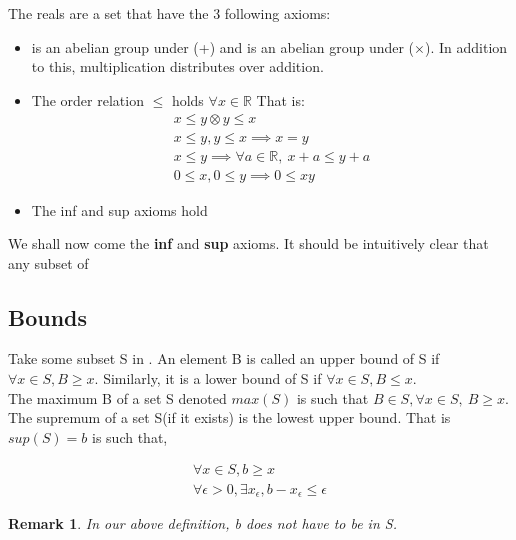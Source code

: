 \documentclass[titlepage]{article}
\newtheorem{remark}{Remark}[section]
\numberwithin{equation}{subsection}
\begin{document}
\begin{tcolorbox}
The reals are a set that have the 3 following axioms:
\begin{itemize}
    \item {} is an abelian group under (+) and  is an abelian group under ($\times$). In addition to this, multiplication distributes over addition.
    \item The order relation $\leq$ holds $\forall x \in \mathbb{R}$ That is:
    \begin{align*}
        x \leq y \otimes y \leq x\\
        x \leq y, y \leq x \implies x = y\\
        x \leq y \implies \forall a \in \mathbb{R},\  x + a \leq y + a\\
        0 \leq x, 0 \leq y \implies 0 \leq xy
    \end{align*}
    \item The inf and sup axioms hold
\end{itemize}

We shall now come the \textbf{inf} and \textbf{sup} axioms. It should be intuitively clear that any subset of  
\end{tcolorbox}

\subsection{Bounds}
Take some subset S in . An element B is called an upper bound of S if $\forall x \in S, B \geq x$. Similarly, it is a lower bound of S if $\forall x \in S, B \leq x$.
\\
The maximum B of a set S denoted $max(S)$ is such that $B \in S, \forall x \in S, \ B \geq x$. 
\\
The supremum of a set S(if it exists) is the lowest upper bound. That is $sup(S) = b$ is such that,


    \begin{align}
        \forall x \in S, b \geq x\\
        \forall \epsilon > 0, \exists x_{\epsilon}, b - x_{\epsilon} \leq \epsilon
    \end{align}
    
    
    
    
    
\begin{remark}

   In our above definition, b does not have to be in S.

\end{remark}
\end{document}
